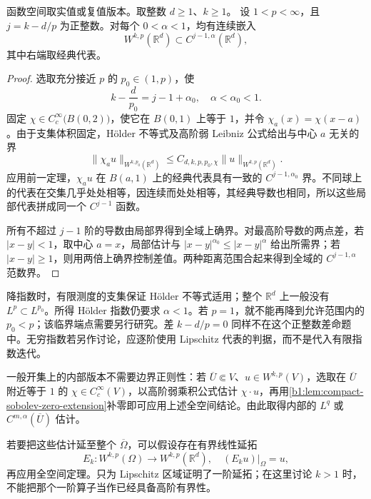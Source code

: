 \begin{proposition}\label{b1:prop:integer-gap-holder-embedding}
函数空间取实值或复值版本。取整数 \(d\geq1\)、\(k\geq1\)。
设 \(1<p<\infty\)，且 \(j=k-d/p\) 为正整数。对每个 \(0<\alpha<1\)，均有连续嵌入
\[
 W^{k,p}(\mathbb R^d)\subset C^{j-1,\alpha}(\mathbb R^d),
\]
其中右端取经典代表。
\end{proposition}
\begin{proof}
选取充分接近 \(p\) 的 \(p_0\in(1,p)\)，使
\[
 k-\frac d{p_0}=j-1+\alpha_0,\quad \alpha<\alpha_0<1.
\]
固定 \(\chi\in C_c^\infty\bigl(B(0,2)\bigr)\)，使它在 \(B(0,1)\) 上等于 \(1\)，并令
\(\chi_a(x)=\chi(x-a)\)。由于支集体积固定，Hölder 不等式及高阶弱 Leibniz 公式给出与中心 \(a\) 无关的界
\[
 \|\chi_a u\|_{W^{k,p_0}(\mathbb R^d)}
 \le C_{d,k,p,p_0,\chi}\|u\|_{W^{k,p}(\mathbb R^d)}.
\]
应用前一定理，\(\chi_a u\) 在 \(B(a,1)\) 上的经典代表具有一致的 \(C^{j-1,\alpha_0}\) 界。不同球上的代表在交集几乎处处相等，因连续而处处相等，其经典导数也相同，所以这些局部代表拼成同一个 \(C^{j-1}\) 函数。

所有不超过 \(j-1\) 阶的导数由局部界得到全域上确界。对最高阶导数的两点差，若 \(|x-y|<1\)，取中心 \(a=x\)，局部估计与
\(|x-y|^{\alpha_0}\le|x-y|^\alpha\) 给出所需界；若 \(|x-y|\ge1\)，则用两倍上确界控制差值。两种距离范围合起来得到全域的 \(C^{j-1,\alpha}\) 范数界。
\end{proof}

降指数时，有限测度的支集保证 Hölder 不等式适用；整个 \(\mathbb R^d\) 上一般没有 \(L^p\subset L^{p_0}\)。所得 Hölder 指数仍要求 \(\alpha<1\)。若 \(p=1\)，就不能再降到允许范围内的 \(p_0<p\)；该临界端点需要另行研究。差 \(k-d/p=0\) 同样不在这个正整数差命题中。无穷指数若另作讨论，应逐阶使用 Lipschitz 代表的判据，而不是代入有限指数迭代。

\ProseParagraphBreak

一般开集上的内部版本不需要边界正则性：若
\(\overline U\Subset V\)、\(u\in W^{k,p}(V)\)，选取在 \(\overline U\) 附近等于 \(1\) 的 \(\chi\in C_c^\infty(V)\)，以高阶弱乘积公式估计 \(\chi\cdot u\)，再用\cref{b1:lem:compact-sobolev-zero-extension}补零即可应用上述全空间结论。由此取得内部的 \(L^q\) 或 \(C^{m,\alpha}(\overline U)\) 估计。

\ProseParagraphBreak

若要把这些估计延至整个 \(\overline\Omega\)，可以假设存在有界线性延拓
\[
 E_k:W^{k,p}(\Omega)\longrightarrow W^{k,p}(\mathbb R^d),
 \quad (E_ku)|_\Omega=u,
\]
再应用全空间定理。只为 Lipschitz 区域证明了一阶延拓；在这里讨论 \(k>1\) 时，不能把那个一阶算子当作已经具备高阶有界性。

